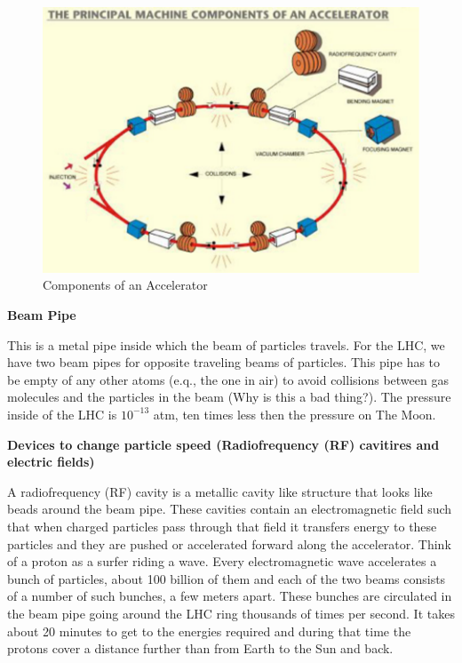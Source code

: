 \;
\;

\begin{figure}[h]
\centering\includegraphics[scale=0.5]{./Particleaccelerators/Pictures/fig2.pdf}
\caption{Components of an Accelerator}
\label{fig:acc2}
\end{figure}

\;
\;
\;

\noindent
\textbf{Beam Pipe}

\;
\;

\noindent 
This is a metal pipe inside which the beam of particles travels. For the LHC, we have two beam pipes for opposite traveling beams of particles. This pipe has to be empty of any other atoms (e.q., the one in air) to avoid collisions between gas molecules and the particles in the beam (Why is this a bad thing?). The pressure inside of the LHC is $ 10^{-13}$ atm, ten times less then the pressure on The Moon.

\;
\;
\;

\noindent
\textbf{Devices to change particle speed (Radiofrequency (RF) cavitires and electric fields)}

\;
\;

\noindent
A radiofrequency (RF) cavity is a metallic cavity like structure that looks like beads around the beam pipe.  These cavities contain an electromagnetic field such that when charged particles pass through that field it transfers energy to these particles and they are pushed or accelerated forward along the accelerator. Think of a proton as a surfer riding a wave.  Every electromagnetic wave accelerates a bunch of particles, about 100 billion of them and each of the two beams consists of a number of such bunches, a few meters apart. These bunches are circulated in the beam pipe going around the LHC ring thousands of times per second. It takes about 20 minutes to get to the energies required and during that time the protons cover a distance further than from Earth to the Sun and back.

